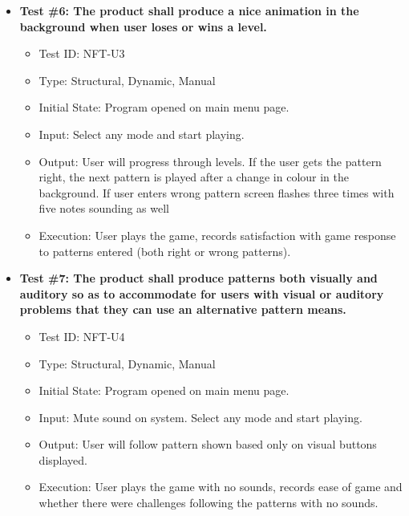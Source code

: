 \documentclass[12pt, titlepage]{article}
\begin{document}
\begin{itemize}
\item \textbf{Test \#6: The product shall produce a nice animation in the background when user loses or wins a level.}
\begin{itemize}
\item Test ID: NFT-U3
\item Type: Structural, Dynamic, Manual				
\item Initial State: Program opened on main menu page.		
\item Input: Select any mode and start playing.
\item Output: User will progress through levels. If the user gets the pattern right, the next pattern is played after a change in colour in the background. If user enters wrong pattern screen flashes three times with five notes sounding as well
\item Execution: User plays the game, records satisfaction with game response to patterns entered (both right or wrong patterns).
\end{itemize}

\item \textbf{Test \#7: The product shall produce patterns both visually and auditory so as to accommodate for users with visual or auditory problems that they can use an alternative pattern means.}
\begin{itemize}
\item Test ID: NFT-U4
\item Type: Structural, Dynamic, Manual				
\item Initial State: Program opened on main menu page.		
\item Input: Mute sound on system. Select any mode and start playing.
\item Output: User will follow pattern shown based only on visual buttons displayed.
\item Execution: User plays the game with no sounds, records ease of game and whether there were challenges following the patterns with no sounds.
\end{itemize}
\end{itemize}
\end{document}
